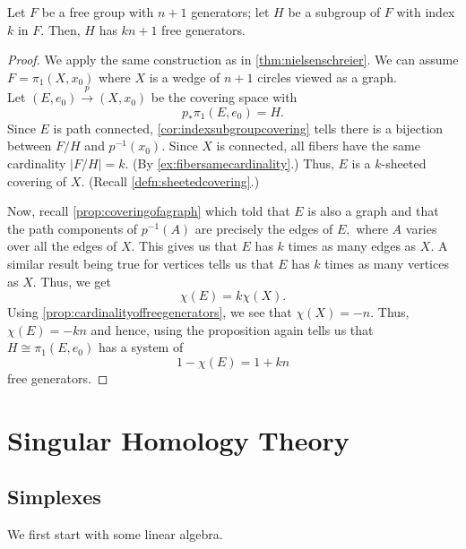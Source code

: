 \documentclass[12pt]{article}
\begin{document}
\begin{thm}
	Let $F$ be a free group with $n + 1$ generators; let $H$ be a subgroup of $F$ with index $k$ in $F.$ Then, $H$ has $kn + 1$ free generators.
\end{thm}
\begin{proof} 
	We apply the same construction as in \cref{thm:nielsenschreier}. We can assume $F = \pi_1(X, x_0)$ where $X$ is a wedge of $n + 1$ circles viewed as a graph. \\
	Let $(E, e_0) \overset{p}{\longrightarrow} (X, x_0)$ be the covering space with
	\begin{equation*} 
		p_*\pi_1(E, e_0) = H.
	\end{equation*}
	Since $E$ is path connected, \cref{cor:indexsubgroupcovering} tells there is a bijection between $F/H$ and $p^{-1}(x_0).$ Since $X$ is connected, all fibers have the same cardinality $|F/H| = k.$ (By \cref{ex:fibersamecardinality}.) Thus, $E$ is a $k$-sheeted covering of $X.$ (Recall \cref{defn:sheetedcovering}.)

	Now, recall \cref{prop:coveringofagraph} which told that $E$ is also a graph and that the path components of $p^{-1}(A)$ are precisely the edges of $E,$ where $A$ varies over all the edges of $X.$ This gives us that $E$ has $k$ times as many edges as $X.$ A similar result being true for vertices tells us that $E$ has $k$ times as many vertices as $X.$ Thus, we get
	\begin{equation*} 
		\chi(E) = k\chi(X).
	\end{equation*}
	Using \cref{prop:cardinalityoffreegenerators}, we see that $\chi(X) = -n.$ Thus, $\chi(E) = -kn$ and hence, using the proposition again tells us that $H \cong \pi_1(E, e_0)$ has a system of
	\begin{equation*} 
		1 - \chi(E) = 1 + kn
	\end{equation*}
	free generators.
\end{proof}

\section{Singular Homology Theory}
\subsection{Simplexes}
We first start with some linear algebra.
\end{document}

